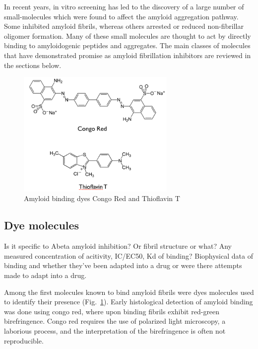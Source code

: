 In recent years, in vitro screening has led to the discovery of a large number of small-molecules which were found to affect the amyloid aggregation pathway. Some inhibited amyloid fibrils, whereas others arrested or reduced non-fibrillar oligomer formation. Many of these small molecules are thought to act by directly binding to amyloidogenic peptides and aggregates. The main classes of molecules that have demonstrated promise as amyloid fibrillation inhibitors are reviewed in the sections below.

\begin{figure}
\centering
\includegraphics[width=3in]{figures/introduction/dyes.png}
\caption[Small molecule binders]{Amyloid binding dyes Congo Red and Thioflavin T}
\label{fig:amyloid_dyes}
\end{figure}

\subsection{Dye molecules}

Is it specific to Abeta amyloid inhibition? Or fibril structure or what? 
Any measured concentration of acitivity, IC/EC50, Kd of binding?
Biophysical data of binding and whether they've been adapted into a drug or were there attempts made to adapt into a drug.

Among the first molecules known to bind amyloid fibrils were dyes molecules used to identify their presence (Fig.~\ref{fig:amyloid_dyes}). Early histological detection of amyloid binding was done using congo red, where upon binding fibrils exhibit red-green birefringence. Congo red requires the use of polarized light microscopy, a laborious process, and the interpretation of the birefringence is often not reproducible.

